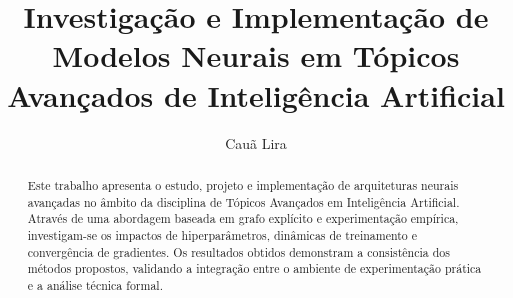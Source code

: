 ﻿\documentclass[runningheads]{llncs}
\begin{document}
\title{Investigação e Implementação de Modelos Neurais em Tópicos Avançados de Inteligência Artificial}

\author{Cauã Lira}


\maketitle

\begin{abstract}
Este trabalho apresenta o estudo, projeto e implementação de arquiteturas neurais avançadas no âmbito da disciplina de Tópicos Avançados em Inteligência Artificial. Através de uma abordagem baseada em grafo explícito e experimentação empírica, investigam-se os impactos de hiperparâmetros, dinâmicas de treinamento e convergência de gradientes. Os resultados obtidos demonstram a consistência dos métodos propostos, validando a integração entre o ambiente de experimentação prática e a análise técnica formal.

\end{abstract}









\end{document}
